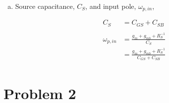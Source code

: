 \documentclass{article}
\begin{document}
\begin{enumerate}[(a)]
\item Source capacitance, \(C_{S}\), and input pole, \(\omega_{p, in}\),

\begin{equation*}
\begin{aligned}
C_{S} &= C_{GS} + C_{SB} \\
\\
\omega_{p, in} &= \frac{g_{m} + g_{mb} + R_{S}^{-1}}{C_{S}} \\
&= \frac{g_{m} + g_{mb} + R_{S}^{-1}}{C_{GS} + C_{SB}} \\
\end{aligned}
\end{equation*}
\end{enumerate}

\section{Problem 2}
\label{sec:org6c1cb10}
\end{document}
